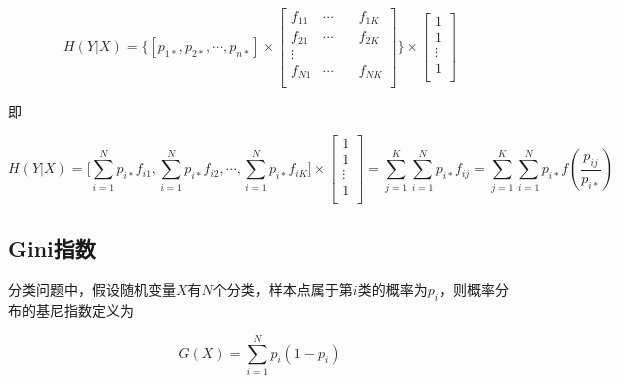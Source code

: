 \begin{remark}
    \begin{equation*}
        H(Y|X) = \Bigg\{ [p_{1*}, p_{2*},\cdots, p_{n*}] \times
        \left[
            \begin{aligned}
                f_{11} & \cdots & \quad f_{1K} \\
                f_{21} & \cdots & \quad f_{2K} \\
                \vdots                         \\
                f_{N1} & \cdots & \quad f_{NK} \\
            \end{aligned}
            \right] \Bigg\} \times
        \left[
            \begin{aligned}
                1      \\
                1      \\
                \vdots \\
                1      \\
            \end{aligned}
            \right]
    \end{equation*}

    即

    \begin{equation*}
        H(Y|X) = \Big[\sum_{i=1}^Np_{i*}f_{i1}, \sum_{i=1}^Np_{i*}f_{i2}, \cdots, \sum_{i=1}^Np_{i*}f_{iK}\Big] \times
        \left[
            \begin{aligned}
                1      \\
                1      \\
                \vdots \\
                1      \\
            \end{aligned}
            \right]
        = \sum_{j=1}^K\sum_{i=1}^Np_{i*}f_{ij} = \sum_{j=1}^K\sum_{i=1}^Np_{i*}f(\frac{p_{ij}}{p_{i*}})
    \end{equation*}

\end{remark}

\subsection{Gini指数}

分类问题中，假设随机变量$X$有$N$个分类，样本点属于第$i$类的概率为$p_i$，则概率分布的基尼指数定义为

\begin{equation*}
    G(X) = \sum_{i=1}^Np_i(1-p_i)
\end{equation*}

